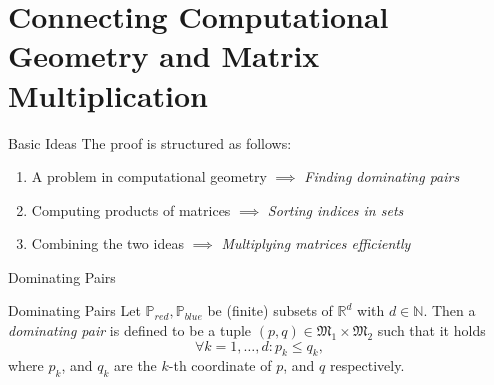 \section{Connecting Computational Geometry and Matrix Multiplication}

\begin{frame}{Basic Ideas}
    The proof is structured as follows:
    \begin{enumerate}
        \item<1-> A problem in computational geometry $\implies$ \emph{Finding dominating pairs}
        \item<2-> Computing products of matrices $\implies$ \emph{Sorting indices in sets}
        \item<3-> Combining the two ideas $\implies$ \emph{Multiplying matrices efficiently}
    \end{enumerate}

\end{frame}

\begin{frame}{Dominating Pairs}
    \begin{alertblock}{Dominating Pairs}
        Let $\mathbb{P}_{red}, \mathbb{P}_{blue}$ be (finite) subsets of $\mathbb{R}^d$ with $d \in \mathbb{N}$.
        Then a \emph{dominating pair} is defined to be a tuple $(p, q) \in \mathfrak{M}_1 \times \mathfrak{M}_2$ such that it holds
        \[
            \forall k = 1, \dots, d: p_k \leq q_k,
        \]
        where $p_k$, and $q_k$ are the $k$-th coordinate of $p$, and $q$ respectively.
    \end{alertblock}
\end{frame}

